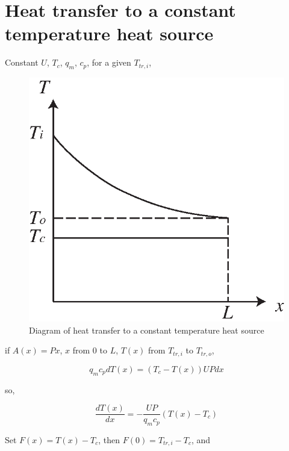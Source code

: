 \documentclass{article}
\begin{document}
\clearpage
\appendix

\section{\noindent \label{sec:CTHT}Heat transfer to a constant temperature heat source}

Constant $U$, $T_{c}$, $q_{m}$, $c_{p}$, for a given $T_{tr,i}$,

\noindent \begin{center}
\begin{figure}[h]
\begin{centering}
\includegraphics[width=0.6\columnwidth]{graphics/ConstTempHX}
\par\end{centering}

\protect\caption{\label{fig:CTHX}Diagram of heat transfer to a constant temperature heat source}
\end{figure}

\par\end{center}

if $A(x)=Px$, $x$ from $0$ to $L$, $T(x)$ from $T_{tr,i}$ to $T_{tr,o}$, 

\begin{equation*}
	q_{m}c_{p}dT(x)=(T_{c}-T(x))UPdx
\end{equation*}

so,

\begin{equation*}
	\frac{dT(x)}{dx}=-\frac{UP}{q_{m}c_{p}}(T(x)-T_{c})
\end{equation*}

Set $F(x)=T(x)-T_{c}$, then $F(0)=T_{tr,i}-T_{c}$, and
\end{document}
